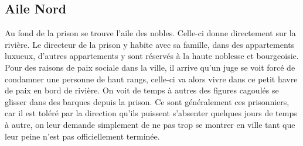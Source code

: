\subsection{Aile Nord}

Au fond de la prison se trouve l'aile des nobles. Celle-ci donne 
directement sur la rivière. Le directeur de la prison y habite avec sa 
famille, dans des appartements luxueux, d'autres appartements y sont 
réservés à la haute noblesse et bourgeoisie. Pour des raisons de paix 
sociale dans la ville, il arrive qu'un juge se voit forcé de condamner une personne
de haut rangs, celle-ci va alors vivre dans ce petit havre de paix en bord
de rivière. On voit 
de temps à autres des figures cagoulés se glisser dans 
des barques depuis la prison. Ce sont généralement ces prisonniers, car il est 
toléré par la direction qu'ils puissent s'absenter quelques jours de temps 
à autre, on leur demande simplement de ne pas trop se montrer en ville 
tant que leur peine n'est pas officiellement terminée.

